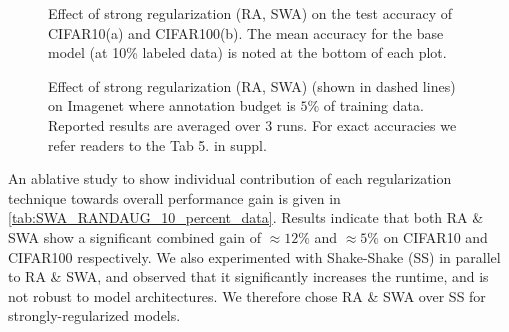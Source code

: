 \documentclass[10pt,twocolumn,letterpaper]{article}
\begin{document}
\begin{figure*}
\begin{center}
  \vspace{-2em}
\end{center}
    \caption{Effect of strong regularization (RA, SWA) on the test accuracy of CIFAR10(a) and CIFAR100(b). The mean accuracy for the base model (at 10\% labeled data) is noted at the bottom of each plot.}
    
\label{fig:cifar_randaug_swa_exp}
  \vspace{-1em}
\end{figure*}

\begin{figure*}
\begin{center}
  \vspace{-2em}
\end{center}
    \caption{Effect of strong regularization (RA, SWA) (shown in dashed lines) on Imagenet where annotation budget is $5\%$ of training data. Reported results are averaged over 3 runs. For exact accuracies we refer readers to the Tab 5. in suppl.}
    \label{fig:imagenet_regularize}
  \vspace{-1em}
\end{figure*}

\noindent An ablative study to show individual contribution of each regularization technique towards overall performance gain is given in \cref{tab:SWA_RANDAUG_10_percent_data}. Results indicate that both RA \& SWA show a significant combined gain of $\approx12\%$ and $\approx5\%$ on CIFAR10 and CIFAR100 respectively. We also experimented with Shake-Shake (SS) \cite{shake-shake_gastaldi2017shake} in parallel to RA \& SWA, and observed that it significantly increases the runtime, and is not robust to model architectures. We therefore chose RA \& SWA over SS for strongly-regularized models.
\end{document}
